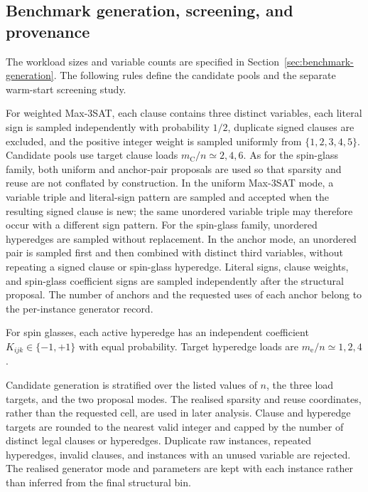 \documentclass[a4paper,onecolumn,11pt,unpublished]{quantumarticle}
\theoremstyle{remark}
\begin{document}

\subsection{Benchmark generation, screening, and provenance}
\label{app:benchmark-generation}

The workload sizes and variable counts are specified in
Section~\ref{sec:benchmark-generation}. The following rules define the
candidate pools and the separate warm-start screening study.

For weighted Max-3SAT, each clause contains three distinct variables, each
literal sign is sampled independently with probability $1/2$, duplicate signed
clauses are excluded, and the positive integer weight is sampled uniformly from
$\{1,2,3,4,5\}$.  Candidate pools use target clause loads
$m_{\mathrm C}/n\simeq2,4,6$.  As for the spin-glass family, both uniform and
anchor-pair proposals are used so that sparsity and reuse are not conflated by
construction.  In the uniform Max-3SAT mode, a variable triple and literal-sign
pattern are sampled and accepted when the resulting signed clause is new; the
same unordered variable triple may therefore occur with a different sign
pattern.  For the spin-glass family, unordered hyperedges are sampled without
replacement.  In the anchor mode, an unordered pair is sampled first and then
combined with distinct third variables, without repeating a signed clause or
spin-glass hyperedge.  Literal signs, clause weights, and spin-glass coefficient
signs are sampled independently after the structural proposal.  The number of
anchors and the requested uses of each anchor belong to the per-instance
generator record.

For spin glasses, each active hyperedge has an independent coefficient
$K_{ijk}\in\{-1,+1\}$ with equal probability. Target hyperedge loads are
$m_{\mathrm e}/n\simeq1,2,4$.

Candidate generation is stratified over the listed values of $n$, the three
load targets, and the two proposal modes.  The realised sparsity and reuse
coordinates, rather than the requested cell, are used in later analysis.
Clause and hyperedge targets are rounded to the nearest valid integer and
capped by the number of distinct legal clauses or hyperedges.  Duplicate raw
instances, repeated hyperedges, invalid clauses, and instances with an unused
variable are rejected.  The realised generator mode and parameters are kept
with each instance rather than inferred from the final structural bin.
\end{document}
